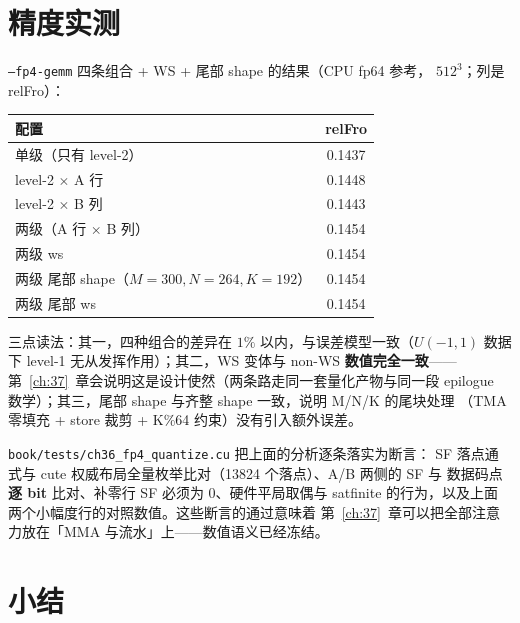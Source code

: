 \section{精度实测}

\texttt{--fp4-gemm} 四条组合 + WS + 尾部 shape 的结果（CPU fp64 参考，
$512^3$；列是 relFro）：

\begin{center}
\footnotesize
\begin{tabular}{lc}
\toprule
配置 & relFro \\
\midrule
单级（只有 level-2） & 0.1437 \\
level-2 $\times$ A 行 & 0.1448 \\
level-2 $\times$ B 列 & 0.1443 \\
两级（A 行 $\times$ B 列） & 0.1454 \\
两级 ws & 0.1454 \\
两级 尾部 shape（$M{=}300,N{=}264,K{=}192$） & 0.1454 \\
两级 尾部 ws & 0.1454 \\
\bottomrule
\end{tabular}
\end{center}

三点读法：其一，四种组合的差异在 $1\%$ 以内，与误差模型一致（$U(-1,1)$ 数据下
level-1 无从发挥作用）；其二，WS 变体与 non-WS \textbf{数值完全一致}——
第~\ref{ch:37}~章会说明这是设计使然（两条路走同一套量化产物与同一段
epilogue 数学）；其三，尾部 shape 与齐整 shape 一致，说明 M/N/K 的尾块处理
（TMA 零填充 + store 裁剪 + K\%64 约束）没有引入额外误差。

\texttt{book/\allowbreak tests/\allowbreak ch36\_fp4\_quantize.cu} 把上面的分析逐条落实为断言：
SF 落点通式与 cute 权威布局全量枚举比对（13824 个落点）、A/B 两侧的 SF 与
数据码点\textbf{逐 bit} 比对、补零行 SF 必须为 0、硬件平局取偶与 satfinite
的行为，以及上面两个小幅度行的对照数值。这些断言的通过意味着
第~\ref{ch:37}~章可以把全部注意力放在「MMA 与流水」上——数值语义已经冻结。

\section{小结}

